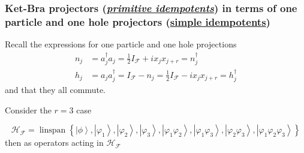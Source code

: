 \documentclass[aps,preprint]{revtex4}%
\begin{document}
\subsubsection{Ket-Bra projectors (\protect\underline{\emph{primitive
idempotents}}) in terms of one particle and one hole projectors
(\protect\underline{simple idempotents})}

Recall the expressions for one particle and one hole projections
\begin{align}
n_{j} &  =a_{j}^{\dagger}a_{j}=\frac{1}{2}I_{\mathcal{F}}+ix_{j}x_{j+r}%
=n_{j}^{\dagger}\\
h_{j} &  =a_{j}a_{j}^{\dagger}=I_{\mathcal{F}}-n_{j}=\frac{1}{2}%
I_{\mathcal{F}}-ix_{j}x_{j+r}=h_{j}^{\dagger}%
\end{align}
and that they all commute. 

Consider the $r=3$ case%

\begin{equation}
\mathcal{H}_{\mathcal{F}}=\operatorname*{linspan}\left\{  \left\vert
\phi\right\rangle ,\left\vert \varphi_{1}\right\rangle ,\left\vert \varphi
_{2}\right\rangle ,\left\vert \varphi_{3}\right\rangle ,\left\vert \varphi
_{1}\varphi_{2}\right\rangle ,\left\vert \varphi_{1}\varphi_{3}\right\rangle
,\left\vert \varphi_{2}\varphi_{3}\right\rangle ,\left\vert \varphi_{1}%
\varphi_{2}\varphi_{3}\right\rangle \right\}
\end{equation}
then as operators acting in $\mathcal{H}_{\mathcal{F}}$
\end{document}
